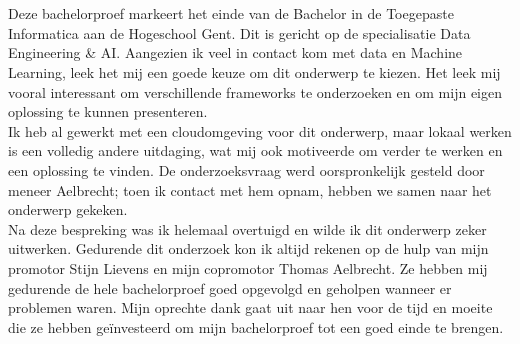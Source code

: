 
\chapter*{}%
\label{ch:voorwoord}
Deze bachelorproef markeert het einde van de Bachelor in de Toegepaste Informatica aan de Hogeschool Gent. Dit is gericht op de specialisatie Data Engineering \& AI. Aangezien ik veel in contact kom met data en Machine Learning, leek het mij een goede keuze om dit onderwerp te kiezen. Het leek mij vooral interessant om verschillende frameworks te onderzoeken en om mijn eigen oplossing te kunnen presenteren.\\

Ik heb al gewerkt met een cloudomgeving voor dit onderwerp, maar lokaal werken is een volledig andere uitdaging, wat mij ook motiveerde om verder te werken en een oplossing te vinden. De onderzoeksvraag werd oorspronkelijk gesteld door meneer Aelbrecht; toen ik contact met hem opnam, hebben we samen naar het onderwerp gekeken.\\

Na deze bespreking was ik helemaal overtuigd en wilde ik dit onderwerp zeker uitwerken. Gedurende dit onderzoek kon ik altijd rekenen op de hulp van mijn promotor Stijn Lievens en mijn copromotor Thomas Aelbrecht. Ze hebben mij gedurende de hele bachelorproef goed opgevolgd en geholpen wanneer er problemen waren. Mijn oprechte dank gaat uit naar hen voor de tijd en moeite die ze hebben geïnvesteerd om mijn bachelorproef tot een goed einde te brengen.
